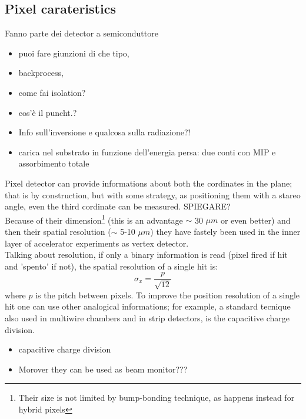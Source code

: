 \label{chip}
\begin{titlepage}

\section{Pixel carateristics}
Fanno parte dei detector a semiconduttore
\begin{itemize}
\item puoi fare giunzioni di che tipo,
\item backprocess,
\item come fai isolation?
\item cos'è il puncht.?
\item Info sull'inversione e qualcosa sulla radiazione?!
\item carica nel substrato in funzione dell'energia persa: due conti con MIP e assorbimento totale
\end{itemize}

Pixel detector can provide informations about both the cordinates in the plane; that is by
construction, but with some strategy, as positioning them with a stareo angle, even
the third cordinate can be measured. SPIEGARE?\\
Because of their dimension\footnote{Their size is not limited by bump-bonding technique,
as happens instead for hybrid pixels} (this is an advantage $\sim$
30 $\mu m$ or even better) and then their spatial resolution
($\sim$ 5-10 $\mu m$) they have fastely been used in the inner layer of accelerator
experiments as vertex detector.\\
Talking about resolution, if only a binary information is read (pixel fired if hit
and 'spento' if not), the spatial resolution of a single hit is:
\begin{equation}
\sigma_x = \frac{p}{\sqrt{12}}
\end{equation}
where $p$ is the pitch between pixels.
To improve the position resolution of a single hit one can use other analogical
informations; for example, a standard tecnique also used in multiwire chambers and
in strip detectors, is the capacitive charge division.\\
\begin{itemize}
\item capacitive charge division
\item Morover they can be used as beam monitor???
\end{itemize}


\end{titlepage}
